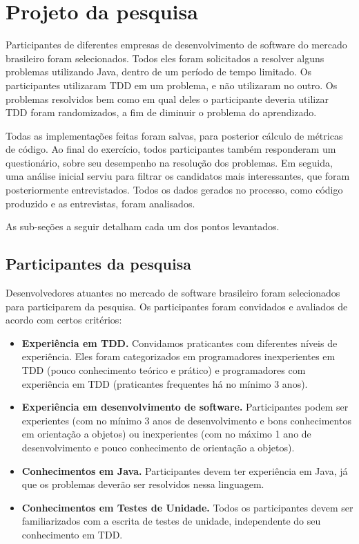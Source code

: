 \section{Projeto da pesquisa}

Participantes de diferentes empresas de desenvolvimento de software do mercado
brasileiro foram selecionados. Todos eles foram solicitados a resolver 
alguns problemas utilizando Java, dentro de um período de tempo limitado. 
Os participantes utilizaram TDD em um problema, e não utilizaram
no outro. Os problemas resolvidos bem como em qual deles o participante
deveria utilizar TDD foram randomizados, a fim de diminuir o problema do aprendizado.

Todas as implementações feitas foram salvas, para posterior
cálculo de métricas de código. Ao final do exercício, todos participantes
também responderam um questionário, sobre seu desempenho na resolução dos problemas.
Em seguida, uma análise inicial serviu para filtrar os candidatos
mais interessantes, que foram posteriormente entrevistados. 
Todos os dados gerados no processo, 
como código produzido e as entrevistas, foram analisados.

As sub-seções a seguir detalham cada um dos pontos levantados.

\subsection{Participantes da pesquisa}
\label{sec:planejamento-participantes}

Desenvolvedores atuantes no mercado de 
software brasileiro foram selecionados para participarem da pesquisa.
Os participantes foram convidados e avaliados de acordo com certos critérios:

\begin{itemize}
	\item \textbf{Experiência em TDD.} Convidamos praticantes com diferentes
	níveis de experiência. Eles foram categorizados em programadores inexperientes em TDD (pouco conhecimento teórico e prático)
	e programadores com experiência em TDD (praticantes frequentes há no mínimo 3 anos).
	
	\item \textbf{Experiência em desenvolvimento de software.} Participantes podem ser
	experientes (com no mínimo 3 anos de desenvolvimento e bons conhecimentos em orientação a objetos) ou 
	inexperientes (com no máximo 1 ano de desenvolvimento e pouco conhecimento de orientação a objetos).

	\item \textbf{Conhecimentos em Java.} 
	Participantes devem ter experiência em Java, já que os problemas deverão ser resolvidos
	nessa linguagem.	
	
	\item \textbf{Conhecimentos em Testes de Unidade.} Todos os participantes devem ser
	familiarizados com a escrita de testes de unidade, independente do seu conhecimento
	em TDD.

\end{itemize}

